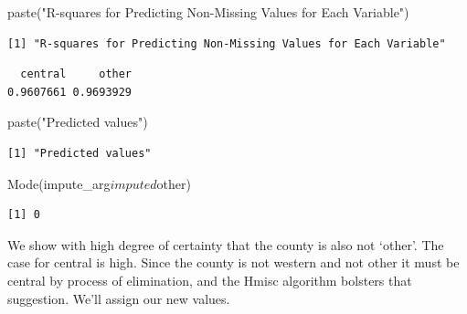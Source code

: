 \documentclass[]{article}
\newenvironment{Shaded}{}{}
\newcommand{\KeywordTok}[1]{\textcolor[rgb]{0.00,0.00,1.00}{#1}}
\newcommand{\NormalTok}[1]{#1}
\newcommand{\OperatorTok}[1]{#1}
\newcommand{\StringTok}[1]{\textcolor[rgb]{0.00,0.50,0.50}{#1}}
\begin{document}
\begin{Shaded}
\begin{Highlighting}[]
\KeywordTok{paste}\NormalTok{(}\StringTok{"R-squares for Predicting Non-Missing Values for Each Variable"}\NormalTok{)}
\end{Highlighting}
\end{Shaded}

\begin{verbatim}
[1] "R-squares for Predicting Non-Missing Values for Each Variable"
\end{verbatim}

\begin{Shaded}
\end{Shaded}

\begin{verbatim}
  central     other 
0.9607661 0.9693929 
\end{verbatim}

\begin{Shaded}
\begin{Highlighting}[]
\KeywordTok{paste}\NormalTok{(}\StringTok{"Predicted values"}\NormalTok{)}
\end{Highlighting}
\end{Shaded}

\begin{verbatim}
[1] "Predicted values"
\end{verbatim}

\begin{Shaded}
\begin{Highlighting}[]
\KeywordTok{Mode}\NormalTok{(impute_arg}\OperatorTok{$}\NormalTok{imputed}\OperatorTok{$}\NormalTok{other)}
\end{Highlighting}
\end{Shaded}

\begin{verbatim}
[1] 0
\end{verbatim}

We show with high degree of certainty that the county is also not
`other'. The case for central is high. Since the county is not western
and not other it must be central by process of elimination, and the
Hmisc algorithm bolsters that suggestion. We'll assign our new values.
\end{document}
